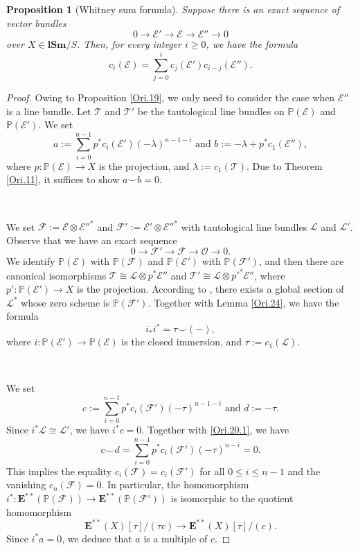 \documentclass[11pt, a4paper]{amsart}
\newtheorem{prop}[thm]{Proposition}
\theoremstyle{definition}
\numberwithin{equation}{subsection}
\renewcommand{\P}{\mathbb{P}}
\newcommand{\lSm}{\mathbf{lSm}}
\newcommand{\cE}{\mathcal{E}}
\newcommand{\cF}{\mathcal{F}}
\newcommand{\cL}{\mathcal{L}}
\newcommand{\cO}{\mathcal{O}}
\newcommand{\cT}{\mathcal{T}}
\newcommand{\ringE}{\mathbf{E}}
\begin{document}
\begin{prop}
[Whitney sum formula]
\label{Ori.20}
Suppose there is an exact sequence of vector bundles
\[
0 \to \cE'\to \cE\to \cE''\to 0
\]
over $X\in \lSm/S$.
Then, for every integer $i\geq 0$, we have the formula
\[
c_i(\cE)
=
\sum_{j=0}^i c_j(\cE')c_{i-j}(\cE'').
\]
\end{prop}
\begin{proof}
Owing to Proposition \ref{Ori.19}, we only need to consider the case when $\cE''$ is a line bundle.
Let $\cT$ and $\cT'$ be the tautological line bundles on $\P(\cE)$ and $\P(\cE')$.
We set
\[
a:=\sum_{i=0}^{n-1}p^*c_i(\cE')(-\lambda)^{n-1-i}
\text{ and }
b:=-\lambda+p^*c_1(\cE''),
\]
where $p\colon \P(\cE)\to X$ is the projection, and $\lambda:=c_1(\cT)$.
Due to Theorem \ref{Ori.11}, it suffices to show $a\smile b=0$.

\

We set $\cF:=\cE\otimes \cE''^*$ and $\cF':=\cE'\otimes \cE''^*$ with tautological line bundles $\cL$ and $\cL'$.
Observe that we have an exact sequence
\[
0 \to \cF' \to \cF \to \cO \to 0.
\]
We identify $\P(\cE)$ with $\P(\cF)$ and $\P(\cE')$ with $\P(\cF')$,
and then there are canonical isomorphisms $\cT\cong \cL\otimes p^*\cE''$ and $\cT'\cong \cL\otimes p'^*\cE''$, 
where $p'\colon \P(\cE')\to X$ is the projection.
According to \cite[Paragraph B.5.6]{Fulton}, there exists a global section of $\cL^*$ whose zero scheme is $\P(\cF')$.
Together with Lemma \ref{Ori.24}, we have the formula
\begin{equation}
\label{Ori.20.1}
i_*i^*=\tau\smile (-),
\end{equation}
where $i\colon \P(\cE')\to \P(\cE)$ is the closed immersion, and $\tau:=c_1(\cL)$.

\

We set
\begin{equation}
\label{Ori.20.2}
c:=\sum_{i=0}^{n-1} p^*c_i(\cF')(-\tau)^{n-1-i}
\text{ and }
d:=-\tau.
\end{equation}
Since $i^*\cL\cong \cL'$, we have $i^*c=0$.
Together with \eqref{Ori.20.1}, we have
\begin{equation}
\label{Ori.20.3}
c\smile d
=
\sum_{i=0}^{n-1} p^*c_i(\cF')(-\tau)^{n-i}=0.
\end{equation}
This implies the equality $c_i(\cF)=c_i(\cF')$ for all $0\leq i\leq n-1$ and the vanishing $c_n(\cF)=0$.
In particular, 
the homomorphism $i^*\colon \ringE^{**}(\P(\cF)) \to \ringE^{**}(\P(\cF'))$ is isomorphic to the quotient homomorphism
\begin{equation}
\label{Ori.20.4}
\ringE^{**}(X)[\tau]/(\tau c)
\to
\ringE^{**}(X)[\tau]/(c).
\end{equation}
Since $i^*a=0$, we deduce that $a$ is a multiple of $c$.


\end{proof}
\end{document}
